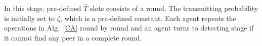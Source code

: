
In this stage, pre-defined $\hat{T}$ slots consists of a round. 
The transmitting probability is initially set to $\zeta$, 
which is a pre-defined constant. Each agent repeats the 
operations in Alg.~\ref{CA} round by round and 
an agent turns to detecting stage if it cannot 
find any peer in a complete round.




